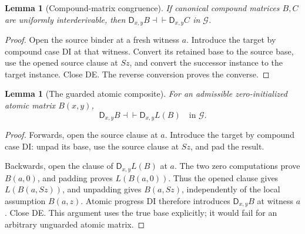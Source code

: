 \documentclass[11pt,letterpaper]{article}
\newtheorem{lemma}[theorem]{Lemma}
\theoremstyle{definition}
\begin{document}
\begin{lemma}[Compound-matrix congruence]
If canonical compound matrices $B,C$ are uniformly interderivable,
then $\mathsf D_{x,y}B\dashv\vdash\mathsf D_{x,y}C$ in $\mathcal G$.
\end{lemma}
\begin{proof}
Open the source binder at a fresh witness $a$.  Introduce the target
by compound case DI at that witness.  Convert its retained base to
the source base, use the opened source clause at $Sz$, and convert
the successor instance to the target instance.  Close DE.  The
reverse conversion proves the converse.
\end{proof}

\begin{lemma}[The guarded atomic composite]
For an admissible zero-initialized atomic matrix $B(x,y)$,
\[
 \mathsf D_{x,y}B\dashv\vdash\mathsf D_{x,y}L(B)
 \quad\text{in }\mathcal G.
 \tag{Atomic composite}\label{eq:guarded-atomic-composite}
\]
\end{lemma}
\begin{proof}
Forwards, open the source clause at $a$.  Introduce the target by
compound case DI: unpad its base, use the source clause at $Sz$, and
pad the result.

Backwards, open the clause of $\mathsf D_{x,y}L(B)$ at $a$.
The two zero computations prove $B(a,0)$, and padding proves
$L(B(a,0))$.
Thus the opened clause gives $L(B(a,Sz))$, and unpadding gives
$B(a,Sz)$, independently of the local assumption $B(a,z)$.
Atomic progress DI therefore introduces $\mathsf D_{x,y}B$ at
witness $a$.  Close DE.  This argument uses the true base explicitly;
it would fail for an arbitrary unguarded atomic matrix.
\end{proof}
\end{document}

